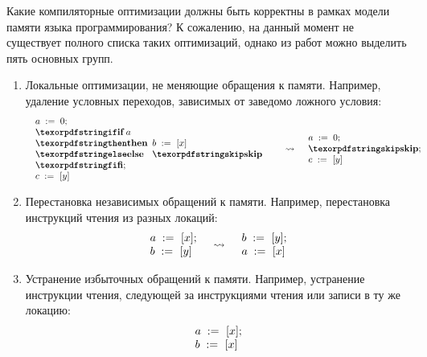 Какие компиляторные оптимизации должны быть корректны в рамках модели памяти языка программирования?
К сожалению, на данный момент не существует полного списка таких оптимизаций, однако из работ
\cite{Vafeiadis-al:POPL15,Morisset-al:PLDI13,Sevcik-Aspinall:ECOOP08} можно выделить пять основных групп.
\begin{enumerate}
  \item Локальные оптимизации, не меняющие обращения к памяти.
    Например, удаление условных переходов, зависимых от заведомо ложного условия:
    \[
      \begin{array}{l c l}
        \begin{array}{l}
        \assignInst{a}{0}; \\
        \iteml{a}{\readInst{b}{x}}{\skipc}; \\
        \readInst{c}{y} \\
        \end{array}
        & \optarrow &
        \begin{array}{l}
          \assignInst{a}{0}; \\
          \skipc; \\
          \readInst{c}{y}
        \end{array}
      \end{array}
    \]
  \item Перестановка независимых обращений к памяти.
    Например, перестановка инструкций чтения из разных локаций:
    \[
      \begin{array}{l c l}
        \begin{array}{l}
        a \;:=_{}\;[x]; \\
        b \;:=_{}\;[y]
        \end{array}
        & \rightsquigarrow &
        \begin{array}{l}
        b \;:=_{}\;[y]; \\
        a \;:=_{}\;[x]
        \end{array}
      \end{array}
    \]
  \item Устранение избыточных обращений к памяти.
    Например, устранение инструкции чтения, следующей за инструкциями чтения или записи в ту же локацию:
    \[
    \begin{array}{c c c}
      \begin{array}{l c l}
        \begin{array}{l}
        a \;:=_{}\;[x]; \\
        b \;:=_{}\;[x]
        \end{array}

\end{array}
\end{array}\]
\end{enumerate}
